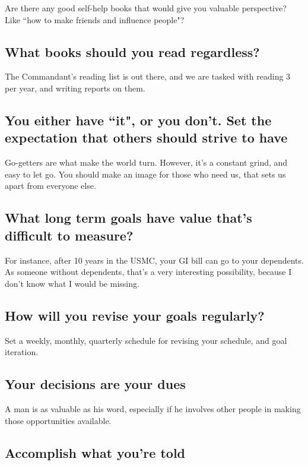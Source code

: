 Are there any good self-help books that would give you valuable perspective?
Like ``how to make friends and influence people"?

\subsection{What books should you read regardless?}

The Commandant's reading list is out there, and we are tasked with reading 3
per year, and writing reports on them.

\subsection{You either have ``it", or you don't. Set the expectation that others should strive to have}

Go-getters are what make the world turn. However, it's a constant grind, and
easy to let go. You should make an image for those who need us, that sets us apart
from everyone else.

\subsection{What long term goals have value that's difficult to measure?}

For instance, after 10 years in the USMC, your GI bill can go to your
dependents. As someone without dependents, that's a very interesting possibility,
because I don't know what I would be missing.

\subsection{How will you revise your goals regularly?}

Set a weekly, monthly, quarterly schedule for revising your schedule, and goal iteration.

\subsection{Your decisions \textbf{are} your dues}

A man is as valuable as his word, especially if he involves other people
in making those opportunities available.

\subsection{Accomplish what you're told}

